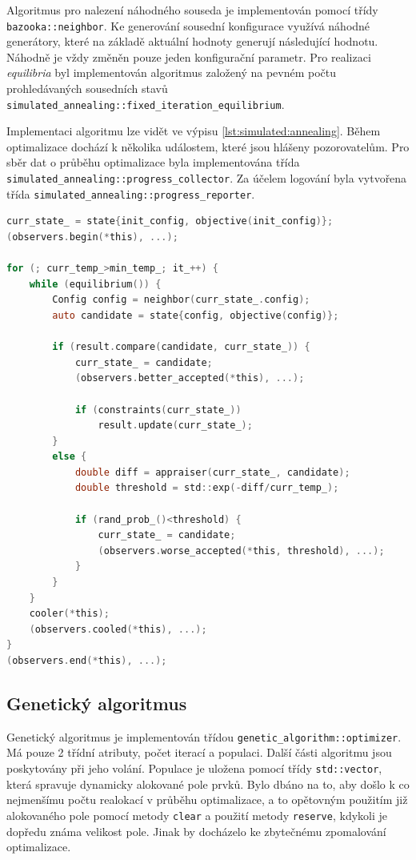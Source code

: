 Algoritmus pro nalezení náhodného souseda je implementován pomocí třídy \texttt{bazooka::neighbor}.
Ke generování sousední konfigurace využívá náhodné generátory, které na základě aktuální hodnoty generují následující hodnotu.
Náhodně je vždy změněn pouze jeden konfigurační parametr.
Pro realizaci \textit{equilibria} byl implementován algoritmus založený na pevném počtu prohledávaných sousedních stavů \texttt{simulated\_annealing::fixed\_iteration\_equilibrium}.

Implementaci algoritmu lze vidět ve výpisu \ref{lst:simulated:annealing}.
Během optimalizace dochází k několika událostem, které jsou hlášeny pozorovatelům.
Pro sběr dat o průběhu optimalizace byla implementována třída \texttt{simulated\_annealing::progress\_collector}.
Za účelem logování byla vytvořena třída \texttt{simulated\_annealing::progress\_reporter}.

\begin{lstlisting}[caption={~Implementace simulovaného ochlazování},label={lst:simulated:annealing},captionpos=t,abovecaptionskip=-\medskipamount,belowcaptionskip=\medskipamount,language=C]
curr_state_ = state{init_config, objective(init_config)};
(observers.begin(*this), ...);

for (; curr_temp_>min_temp_; it_++) {
    while (equilibrium()) {
        Config config = neighbor(curr_state_.config);
        auto candidate = state{config, objective(config)};

        if (result.compare(candidate, curr_state_)) {
            curr_state_ = candidate;
            (observers.better_accepted(*this), ...);

            if (constraints(curr_state_))
                result.update(curr_state_);
        }
        else {
            double diff = appraiser(curr_state_, candidate);
            double threshold = std::exp(-diff/curr_temp_);

            if (rand_prob_()<threshold) {
                curr_state_ = candidate;
                (observers.worse_accepted(*this, threshold), ...);
            }
        }
    }
    cooler(*this);
    (observers.cooled(*this), ...);
}
(observers.end(*this), ...);
\end{lstlisting}

\subsection{Genetický algoritmus}
Genetický algoritmus je implementován třídou \texttt{genetic\_algorithm::optimizer}.
Má pouze 2 třídní atributy, počet iterací a populaci.
Další části algoritmu jsou poskytovány při jeho volání.
Populace je uložena pomocí třídy \texttt{std::vector}, která spravuje dynamicky alokované pole prvků.
Bylo dbáno na to, aby došlo k co nejmenšímu počtu realokací v průběhu optimalizace, a to opětovným použitím již alokovaného pole pomocí metody \texttt{clear} a použití metody \texttt{reserve}, kdykoli je dopředu známa velikost pole.
Jinak by docházelo ke zbytečnému zpomalování optimalizace.

